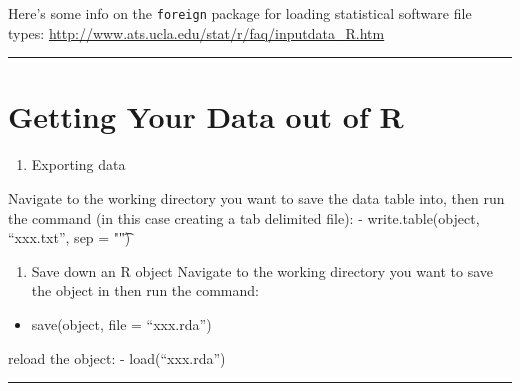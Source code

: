 \documentclass[]{book}
\providecommand{\tightlist}{%
  \setlength{\itemsep}{0pt}\setlength{\parskip}{0pt}}
\begin{document}
Here's some info on the \texttt{foreign} package for loading statistical software file types: \url{http://www.ats.ucla.edu/stat/r/faq/inputdata_R.htm}

\begin{center}\rule{0.5\linewidth}{0.5pt}\end{center}

\hypertarget{getting-your-data-out-of-r}{%
\section{Getting Your Data out of R}\label{getting-your-data-out-of-r}}

\begin{enumerate}
\def\labelenumi{\arabic{enumi}.}
\tightlist
\item
  Exporting data
\end{enumerate}

Navigate to the working directory you want to save the data table into, then run the command (in this case creating a tab delimited file):
- write.table(object, ``xxx.txt'', sep = "\t")

\begin{enumerate}
\def\labelenumi{\arabic{enumi}.}
\setcounter{enumi}{1}
\tightlist
\item
  Save down an R object
  Navigate to the working directory you want to save the object in then run the command:
\end{enumerate}

\begin{itemize}
\tightlist
\item
  save(object, file = ``xxx.rda'')
\end{itemize}

reload the object:
- load(``xxx.rda'')

\begin{center}\rule{0.5\linewidth}{0.5pt}\end{center}
\end{document}

